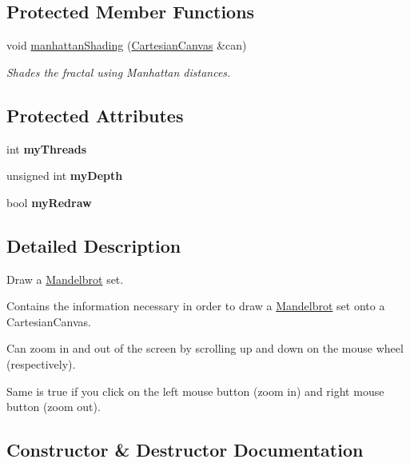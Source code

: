 \subsection*{Protected Member Functions}
\begin{DoxyCompactItemize}
\item 
void \hyperlink{class_mandelbrot_aef094f9bb9b2fd1107481b150205ff53}{manhattan\+Shading} (\hyperlink{classtsgl_1_1_cartesian_canvas}{Cartesian\+Canvas} \&can)
\begin{DoxyCompactList}\small\item\em Shades the fractal using Manhattan distances. \end{DoxyCompactList}\end{DoxyCompactItemize}
\subsection*{Protected Attributes}
\begin{DoxyCompactItemize}
\item 
\mbox{\label{class_mandelbrot_a41edcc618b65717d6511afb9f6e6031a}} 
int {\bfseries my\+Threads}
\item 
\mbox{\label{class_mandelbrot_ae42189a68d6c97ba7614888eb20f07f0}} 
unsigned int {\bfseries my\+Depth}
\item 
\mbox{\label{class_mandelbrot_a3c79bfb1dd830a8d4d8f766a5bec83a4}} 
bool {\bfseries my\+Redraw}
\end{DoxyCompactItemize}


\subsection{Detailed Description}
Draw a \hyperlink{class_mandelbrot}{Mandelbrot} set. 

Contains the information necessary in order to draw a \hyperlink{class_mandelbrot}{Mandelbrot} set onto a Cartesian\+Canvas.

Can zoom in and out of the screen by scrolling up and down on the mouse wheel (respectively).

Same is true if you click on the left mouse button (zoom in) and right mouse button (zoom out). 

\subsection{Constructor \& Destructor Documentation}
\mbox{\label{class_mandelbrot_ae0c71b1d8894206cb896412ae2fa1529}} 
